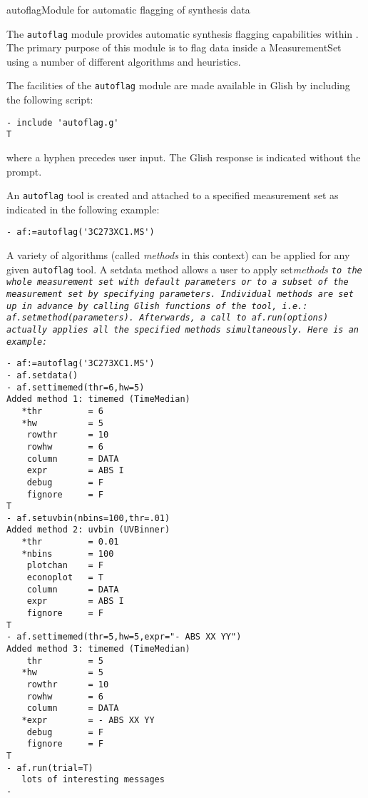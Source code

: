 \begin{ahmodule}{autoflag}{Module for automatic flagging of synthesis data}

\begin{ahdescription}

The {\tt autoflag} module provides automatic synthesis flagging capabilities
within \aipspp. The primary purpose of this module is to flag data
inside a MeasurementSet using a number of different algorithms and heuristics.

The facilities of the {\tt autoflag} module are made available in Glish by
including the following script:

\begin{verbatim}
- include 'autoflag.g'
T
\end{verbatim}

where a hyphen precedes user input. The Glish response is indicated
without the prompt.

An {\tt autoflag} tool is created and attached to a specified
measurement set as indicated in the following example:

\begin{verbatim}
- af:=autoflag('3C273XC1.MS')
\end{verbatim}

A variety of algorithms (called {\em methods} in this context) can be applied
for any given {\tt autoflag} tool. A setdata method allows a user to apply 
set\em methods \/\tt to the whole measurement set with default parameters or 
to a subset of the measurement set by specifying parameters. Individual 
methods are set up in advance by calling Glish functions of the tool, 
i.e.: {\tt af.set\em method\/\tt(\em parameters\/\tt)}.  Afterwards, a call 
to {\tt af.run(\em options\/)} actually applies all the specified methods
simultaneously. Here is an example:

\begin{verbatim}
- af:=autoflag('3C273XC1.MS')
- af.setdata()
- af.settimemed(thr=6,hw=5)
Added method 1: timemed (TimeMedian)
   *thr         = 6
   *hw          = 5
    rowthr      = 10
    rowhw       = 6
    column      = DATA
    expr        = ABS I
    debug       = F
    fignore     = F
T
- af.setuvbin(nbins=100,thr=.01)
Added method 2: uvbin (UVBinner)
   *thr         = 0.01
   *nbins       = 100
    plotchan    = F
    econoplot   = T
    column      = DATA
    expr        = ABS I
    fignore     = F
T
- af.settimemed(thr=5,hw=5,expr="- ABS XX YY")
Added method 3: timemed (TimeMedian)
    thr         = 5
   *hw          = 5
    rowthr      = 10
    rowhw       = 6
    column      = DATA
   *expr        = - ABS XX YY
    debug       = F
    fignore     = F
T
- af.run(trial=T)
   lots of interesting messages
-
\end{verbatim}


\end{ahdescription}
\end{ahmodule}
